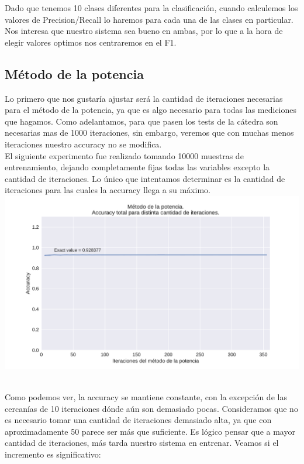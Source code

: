 Dado que tenemos 10 clases diferentes para la clasificación, cuando calculemos los valores de Precision/Recall lo haremos para cada una de las clases en particular. Nos interesa que nuestro sistema sea bueno en ambas, por lo que a la hora de elegir valores optimos nos centraremos en el F1. \\

\subsection{Método de la potencia}

Lo primero que nos gustaría ajustar será la cantidad de iteraciones necesarias para el método de la potencia, ya que es algo necesario para todas las mediciones que hagamos. Como adelantamos, para que pasen los tests de la cátedra son necesarias mas de 1000 iteraciones, sin embargo, veremos que con muchas menos iteraciones nuestro accuracy no se modifica. \\

El siguiente experimento fue realizado tomando 10000 muestras de entrenamiento, dejando completamente fijas todas las variables excepto la cantidad de iteraciones. Lo único que intentamos determinar es la cantidad de iteraciones para las cuales la accuracy llega a su máximo. \\

{\centering
    \includegraphics[scale=0.55]{informe/imagenes/potencia/accuracyPorIters.pdf} \\
}
$ $\newline

Como podemos ver, la accuracy se mantiene constante, con la excepción de las cercanías de 10 iteraciones dónde aún son demasiado pocas. Consideramos que no es necesario tomar una cantidad de iteraciones demasiado alta, ya que con aproximadamente 50 parece ser más que suficiente. Es lógico pensar que a mayor cantidad de iteraciones, más tarda nuestro sistema en entrenar. Veamos si el incremento es significativo: \\

